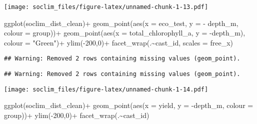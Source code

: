 \documentclass[
]{article}
\newenvironment{Shaded}{\begin{snugshade}}{\end{snugshade}}
\newcommand{\AttributeTok}[1]{\textcolor[rgb]{0.77,0.63,0.00}{#1}}
\newcommand{\DecValTok}[1]{\textcolor[rgb]{0.00,0.00,0.81}{#1}}
\newcommand{\FunctionTok}[1]{\textcolor[rgb]{0.00,0.00,0.00}{#1}}
\newcommand{\NormalTok}[1]{#1}
\newcommand{\SpecialCharTok}[1]{\textcolor[rgb]{0.00,0.00,0.00}{#1}}
\newcommand{\StringTok}[1]{\textcolor[rgb]{0.31,0.60,0.02}{#1}}
\begin{document}
\texttt{[image: soclim\_files/figure-latex/unnamed-chunk-1-13.pdf]}

\begin{Shaded}
\begin{Highlighting}[]
\FunctionTok{ggplot}\NormalTok{(soclim\_dist\_clean)}\SpecialCharTok{+}
  \FunctionTok{geom\_point}\NormalTok{(}\FunctionTok{aes}\NormalTok{(}\AttributeTok{x =}\NormalTok{ eco\_test, }\AttributeTok{y =} \SpecialCharTok{{-}}\NormalTok{ depth\_m, }\AttributeTok{colour =}\NormalTok{ group))}\SpecialCharTok{+}
  \FunctionTok{geom\_point}\NormalTok{(}\FunctionTok{aes}\NormalTok{(}\AttributeTok{x =}\NormalTok{ total\_chlorophyll\_a, }\AttributeTok{y =} \SpecialCharTok{{-}}\NormalTok{depth\_m), }\AttributeTok{colour =} \StringTok{"Green"}\NormalTok{)}\SpecialCharTok{+}
  \FunctionTok{ylim}\NormalTok{(}\SpecialCharTok{{-}}\DecValTok{200}\NormalTok{,}\DecValTok{0}\NormalTok{)}\SpecialCharTok{+}
  \FunctionTok{facet\_wrap}\NormalTok{(.}\SpecialCharTok{\textasciitilde{}}\NormalTok{cast\_id, }\AttributeTok{scales =} \StringTok{\textquotesingle{}free\_x\textquotesingle{}}\NormalTok{)}
\end{Highlighting}
\end{Shaded}

\begin{verbatim}
## Warning: Removed 2 rows containing missing values (geom_point).
\end{verbatim}

\begin{verbatim}
## Warning: Removed 2 rows containing missing values (geom_point).
\end{verbatim}

\texttt{[image: soclim\_files/figure-latex/unnamed-chunk-1-14.pdf]}

\begin{Shaded}
\begin{Highlighting}[]
\FunctionTok{ggplot}\NormalTok{(soclim\_dist\_clean)}\SpecialCharTok{+}
  \FunctionTok{geom\_point}\NormalTok{(}\FunctionTok{aes}\NormalTok{(}\AttributeTok{x =}\NormalTok{ yield, }\AttributeTok{y =}  \SpecialCharTok{{-}}\NormalTok{depth\_m, }\AttributeTok{colour =}\NormalTok{ group))}\SpecialCharTok{+}
  \FunctionTok{ylim}\NormalTok{(}\SpecialCharTok{{-}}\DecValTok{200}\NormalTok{,}\DecValTok{0}\NormalTok{)}\SpecialCharTok{+}
  \FunctionTok{facet\_wrap}\NormalTok{(.}\SpecialCharTok{\textasciitilde{}}\NormalTok{cast\_id)}
\end{Highlighting}
\end{Shaded}
\end{document}
